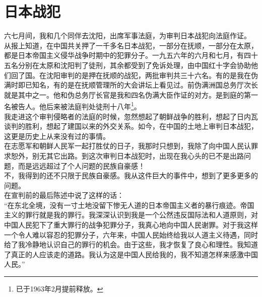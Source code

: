\fancyhead[RO]{} %
\fancyhead[LE]{} %
\chapter*{日本战犯}
\thispagestyle{empty}
六七月间，我和几个同伴去沈阳，出席军事法庭，为审判日本战犯向法庭作证。\\

从报上知道，在中国共关押了一千多名日本战犯，一部分在抚顺，一部分在太原，都是日本帝国主义侵华战争时期中的犯罪分子。一九五六年的六月和七月，有四十五名分别在太原和沈阳判了徒刑，其余都受到了免诉处理，由中国红十字会协助他们回了国。在沈阳审判的是押在抚顺的战犯，两批审判共三十六名。有的是我在伪满时即已知名，有的是在抚顺管理所的大会讲坛上看见过。前伪满洲国总务厅次长就是其中之一。他和伪总务厅长官是我和四名伪满大臣作证的对方。是到庭的第一名被告人。他后来被法庭判处徒刑十八年\footnote{已于1963年2月提前释放。}。\\

我走进这个审判侵略者的法庭的时候，忽然想起了朝鲜战争的胜利，想起了日内瓦谈判的胜利，想起了建国以来的外交关系。如今，在中国的土地上审判日本战犯，这更是历史上从来没有过的事情。\\

在志愿军和朝鲜人民军一起打胜仗的日子，我那时只想到，我除了向中国人民认罪求恕外，别无其它出路。到这次审判日本战犯时，出现在我心头的已不是出路问题，而是远远超过了个人问题的民族自豪感！\\

不，我得到的还不只限于民族自豪感。我从这件巨大的事件中，想到了更多更多的问题。\\

在宣判前的最后陈述中说了这样的话：\\

“在东北全境，没有一寸土地没留下惨无人道的日本帝国主义者的暴行痕迹。帝国主义的罪行就是我的罪行。我深深认识到我是一个公然违反国际法和人道原则，对中国人民犯下了重大罪行的战争犯罪分子，我真心地向中国人民谢罪。对于我这样一个令人难以容忍的犯罪分子，六年来，中国人民始终给我以人道主义待遇，同时给了我冷静地认识自己的罪行的机会。由于这些，我才恢复了良心和理性。我知道了真正的人应该走的道路。我认为这是中国人民给我的，我不知道怎样来感激中国人民。”\\

